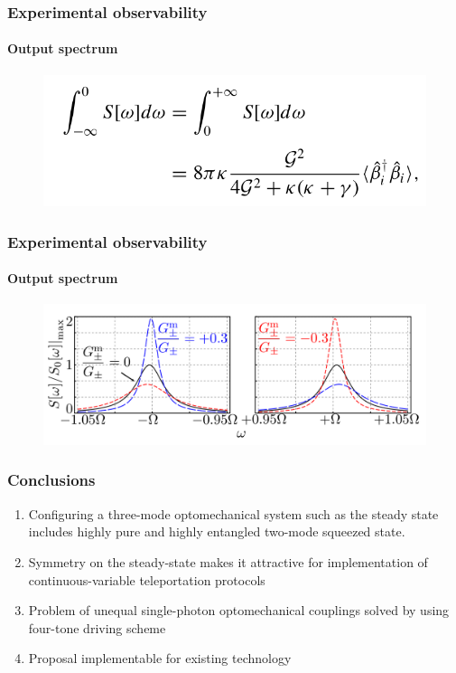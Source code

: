 \documentclass[aspectratio=43]{beamer}
\begin{document}
\begin{frame}
	
	\frametitle{Experimental observability}
	\framesubtitle{Output spectrum}
	
	\begin{figure}
		\includegraphics[width = 6 cm]{plots/spectrum.png}
	\end{figure}	

\end{frame}

\begin{frame}

\frametitle{Experimental observability}
\framesubtitle{Output spectrum}
	
	\begin{figure}
		\includegraphics[width = 9 cm]{plots/plot_spectrum.png}
	\end{figure}	

\end{frame}

\begin{frame}

	\frametitle{Conclusions}
	
	\begin{enumerate}
		\item Configuring a three-mode optomechanical system such as the steady state includes highly pure and highly entangled two-mode squeezed state.
		\item Symmetry on the steady-state makes it attractive for implementation of  continuous-variable teleportation protocols
		\item Problem of unequal single-photon optomechanical couplings solved by using four-tone driving scheme
		\item Proposal implementable for existing technology
	\end{enumerate}
		
\end{frame}
\end{document}
